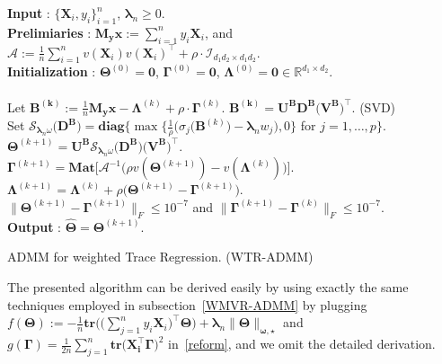 \documentclass[alpha-refs]{wiley-article}
\begin{document}
\begin{algorithm}[hbt!]
    \textbf{Input} : $\big\{\boldsymbol{X}_{i},y_{i}\big\}_{i=1}^{n}$, $\boldsymbol{\lambda}_{n} \geq 0$. \\
    \textbf{Prelimiaries} : $\boldsymbol{M_{y}x}:=\sum_{i=1}^{n}y_{i}\boldsymbol{X}_{i}$, and
    $\mathcal{A} := \frac{1}{n}\sum_{i=1}^{n} v(\boldsymbol{X}_{i})v(\boldsymbol{X}_{i})^{\top}+\rho\cdot\mathcal{I}_{ d_1d_2 \times d_1d_2}$. \\
    \textbf{Initialization} : $\boldsymbol{\Theta}^{(0)}=\boldsymbol{0}$, $\boldsymbol{\Gamma}^{(0)}=\boldsymbol{0}$, $\boldsymbol{\Lambda}^{(0)}=\boldsymbol{0} \in\mathbb{R}^{d_{1}\times d_{2}}$. \\
     \\
    \qquad {} Let $\boldsymbol{B^{(k)}}:=\frac{1}{n}\boldsymbol{M_{y}x}-\boldsymbol{\Lambda}^{(k)}+\rho \cdot \boldsymbol{\Gamma}^{(k)}$. \quad $\boldsymbol{B^{(k)}}=\boldsymbol{U}^{\textbf{B}}\boldsymbol{D}^{\textbf{B}}\big(\boldsymbol{V^{\textbf{B}}}\big)^{\top}$. (SVD) \\
    \qquad \qquad \qquad \qquad  Set $\mathcal{S}_{\boldsymbol{\lambda}_{n}\omega}\big(\boldsymbol{D}^{\textbf{B}}\big) = \textbf{diag}\bigg\{ \max\bigg\{\frac{1}{\rho}\big(\sigma_{j}(\boldsymbol{B}^{(k)}\big)-\boldsymbol{\lambda}_{n} w_{j}\big),0 \bigg\}$ for $j=1,\dots,p \bigg\}$.  \\
    \qquad \qquad \qquad \qquad $\boldsymbol{\Theta}^{(k+1)} = \boldsymbol{U}^{\textbf{B}} \mathcal{S}_{\boldsymbol{\lambda}_{n}\omega}\big(\boldsymbol{D}^{\textbf{B}}\big) \big(\boldsymbol{V^{\textbf{B}}}\big)^{\top}$.  \\
    \qquad {}
    $\boldsymbol{\Gamma}^{(k+1)} = \textbf{Mat} \big[\mathcal{A}^{-1}\big(\rho v(\boldsymbol{\Theta}^{(k+1)})-v(\boldsymbol{\Lambda}^{(k)})\big)\big].$\\
    \qquad {} $\boldsymbol{\Lambda}^{(k+1)} = \boldsymbol{\Lambda}^{(k)} + \rho\big( \boldsymbol{\Theta}^{(k+1)}-\boldsymbol{\Gamma}^{(k+1)} \big)$.\\
     $\| \boldsymbol{\Theta}^{(k+1)}-\boldsymbol{\Gamma}^{(k+1)} \|_{F}\leq 10^{-7}$ and $\| \boldsymbol{\Gamma}^{(k+1)}-\boldsymbol{\Gamma}^{(k)} \|_{F}\leq 10^{-7}$. \\
    \textbf{Output} : $\widehat{\boldsymbol{\Theta}}=\boldsymbol{\Theta}^{(k+1)}$.
    \caption{ADMM for weighted Trace Regression. (WTR-ADMM)}
    \label{trace_algo}
\end{algorithm}
The presented algorithm can be derived easily by using exactly the same techniques employed in subsection~\ref{WMVR-ADMM} by plugging $f(\boldsymbol{\Theta}):=-\frac{1}{n}\textbf{tr}\big( \big(\sum_{j=1}^{n}y_{i}\boldsymbol{X}_{i}\big)^{\top}\boldsymbol{\Theta} \big)+\boldsymbol{\lambda}_{n}\|\boldsymbol{\Theta}\|_{\boldsymbol{\omega,\star}}$ and $g(\boldsymbol{\Gamma})=\frac{1}{2n}\sum_{j=1}^{n}\textbf{tr}\big(\boldsymbol{X_i^\top}\boldsymbol{\Gamma}\big)^{2}$ in~\eqref{reform},
and we omit the detailed derivation.
\end{document}

